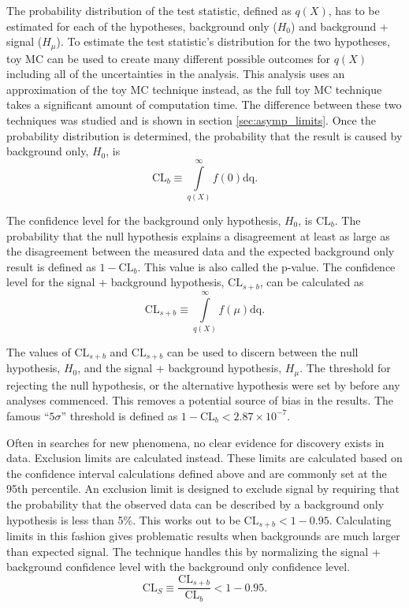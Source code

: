 The probability distribution of the test statistic, defined as $q\left(X\right)$, has to be estimated for each of the hypotheses, background only ($H_{0}$) and background + signal ($H_{\mu}$). To estimate the test statistic's distribution for the two hypotheses, toy MC can be used to create many different possible outcomes for $q\left(X\right)$ including all of the uncertainties in the analysis. This analysis uses an approximation of the toy MC technique instead, as the full toy MC technique takes a significant amount of computation time. The difference between these two techniques was studied and is shown in section \ref{sec:asymp_limits}. Once the probability distribution is determined, the probability that the result is caused by background only, $H_{0}$, is
\begin{equation}
    \mathrm{CL}_{b}
    \equiv
    \int\limits_{q\left(X\right)}^{\infty}f\left(0\right)\mathrm{dq}.
\end{equation}

The confidence level for the background only hypothesis, $H_{0}$, is $\mathrm{CL}_{b}$. The probability that the null hypothesis explains a disagreement at least as large as the disagreement between the measured data and the expected background only result is defined as $1-\mathrm{CL}_{b}$. This value is also called the p-value. The confidence level for the signal + background hypothesis, $\mathrm{CL}_{s+b}$, can be calculated as
\begin{equation}
    \mathrm{CL}_{s+b}
    \equiv
    \int\limits_{q\left(X\right)}^{\infty}f\left(\mu\right)\mathrm{dq}.
\end{equation}

The values of $\mathrm{CL}_{s+b}$ and $\mathrm{CL}_{s+b}$ can be used to discern between the null hypothesis, $H_{0}$, and the signal + background hypothesis, $H_{\mu}$. The threshold for rejecting the null hypothesis, or the alternative hypothesis were set by \CMS before any analyses commenced. This removes a potential source of bias in the results. The famous ``$5\sigma$'' threshold is defined as $1-\mathrm{CL}_{b} < 2.87\times10^{-7}$.

Often in searches for new phenomena, no clear evidence for discovery exists in data. Exclusion limits are calculated instead. These limits are calculated based on the confidence interval calculations defined above and are commonly set at the 95th percentile. An exclusion limit is designed to exclude signal by requiring that the probability that the observed data can be described by a background only hypothesis is less than 5\%. This works out to be $\mathrm{CL}_{s+b}<1-0.95$. Calculating limits in this fashion gives problematic results when backgrounds are much larger than expected signal. The \CLs technique handles this by normalizing the signal + background confidence level with the background only confidence level.
\begin{equation}
    \mathrm{CL}_{S}
    \equiv
    \frac{\mathrm{CL}_{s+b}}{\mathrm{CL}_{b}} < 1-0.95.
\end{equation}


